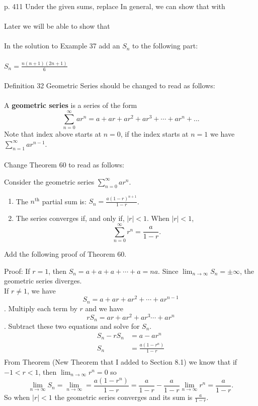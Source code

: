 \documentclass[10pt]{article}
\newcommand{\ds}{\displaystyle}
\begin{document}
p. 411    Under the given sums, replace In general, we can show that with \\ \\

Later we will be able to show that    \\ \\

In the solution to Example 37 add an $S_n$  to the following part:\\ \\

$\ds S_n=\frac{n(n+1)(2n+1)}{6}$ \\ \\

Definition 32 Geometric Series should be changed to read as follows:\\ \\ 

A \textbf{geometric series} is a series of the form $$\ds \sum_{n=0}^\infty ar^n=a+ar+ar^2+ar^3+\cdots+ar^n+...$$
Note that index above starts at $n=0$, if the index starts at $n=1$ we have $\ds \sum_{n=1}^\infty ar^{n-1}$. \\ \\

Change Theorem 60 to read as follows:

Consider the geometric series $\ds \sum_{n=0}^\infty ar^n$.
\begin{enumerate}
\item		The $n^{\text{th}}$ partial sum is: $\ds S_n = \frac{a(1-r)^{n+1}}{1-r}$.
\item		The series converges if, and only if, $|r| < 1$. When $|r|<1$, 
$$\sum_{n=0}^\infty r^n = \frac{a}{1-r}.$$
\end{enumerate}

Add the following proof of Theorem 60.

Proof:  If $r=1$, then $S_n=a+a+a+\cdots+a=na$. Since $\lim_{n\to \infty} S_n=\pm \infty$, the geometric series diverges.\\
If $r\neq 1$, we have $$S_n=a+ar+ar^2+\cdots +ar^{n-1}$$. Multiply each term by $r$ and we have 
$$rS_n=ar+ar^2+ar^3\cdots +ar^n$$.  Subtract these two equations and solve for $S_n$.
\begin{align*}
S_n-rS_n &=a-ar^n \\
S_n &=\frac{a(1-r^n)}{1-r}\\
\end{align*}
From Theorem {(New Theorem that I added to Section 8.1)} we know that if $-1<r<1$, then $\ds \lim_{n\to \infty} r^n=0$ so
$$\lim_{n\to \infty} S_n=\lim_{n\to \infty}=\frac{a(1-r^n)}{1-r}=\frac{a}{1-r}- \frac{a}{1-r}\lim_{n\to \infty}r^n=\frac{a}{1-r}.$$ So when $|r|<1$ the geometric series converges and its sum is $\ds \frac{a}{1-r}$. \\
\end{document}
